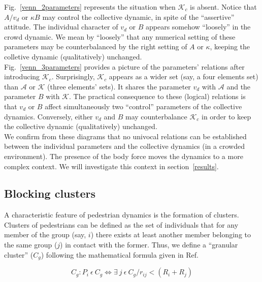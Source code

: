 \documentclass[preprint,12pt]{elsarticle}
\begin{document}
Fig.~\ref{venn_2parameters} represents the situation when $\mathcal{K}_c$ is 
absent. Notice that $A/v_d$ or $\kappa B$ may control the collective 
dynamic, in spite of the ``assertive'' attitude. The individual character of 
$v_d$ or $B$ appears somehow ``loosely'' in the crowd dynamic. We mean by 
``loosely'' that any numerical setting of these parameters may be 
counterbalanced by the right setting of $A$ or $\kappa$, keeping the 
colletive dynamic (qualitatively) unchanged.  \\

Fig.~\ref{venn_3parameters} provides a picture of the parameters' relations 
after introducing $\mathcal{K}_c$. Surprisingly, $\mathcal{K}_c$ appears as a
wider set (say, a four elements set) than $\mathcal{A}$ or $\mathcal{K}$ (three 
elements' sets). It shares the parameter $v_d$ with $\mathcal{A}$ and the 
parameter $B$ with $\mathcal{K}$. The practical consequence to these (logical)
relations is that $v_d$ or $B$ affect simultaneously two ``control'' parameters 
of the collective dynamics. Conversely, either $v_d$ and $B$ may counterbalance 
$\mathcal{K}_c$ in order to keep the collective dynamic (qualitatively) 
unchanged.  \\

We confirm from these diagrams that no univocal relations can be established 
between the individual parameters and the collective dynamics (in a crowded 
environment). The presence of the body force moves the dynamics to a more 
complex context. We will investigate this context in section~\ref{results}. \\


\subsection{\label{blocking_clusters} Blocking clusters}

A characteristic feature of pedestrian dynamics is the formation of clusters. Clusters of pedestrians can 
be defined as the set of individuals that for any member of the group (say, $i$) there exists at least another member belonging to the same group ($j$) in contact with the former. Thus, we define a ``granular cluster'' ($C_g$) following the mathematical formula given in Ref.~\cite{dorso_2005}

\begin{equation}
C_g:P_i~\epsilon~ C_g \Leftrightarrow \exists~ j~\epsilon~C_g / r_{ij} < (R_i+R_j) \label{ec-cluster}
\end{equation}
\end{document}

